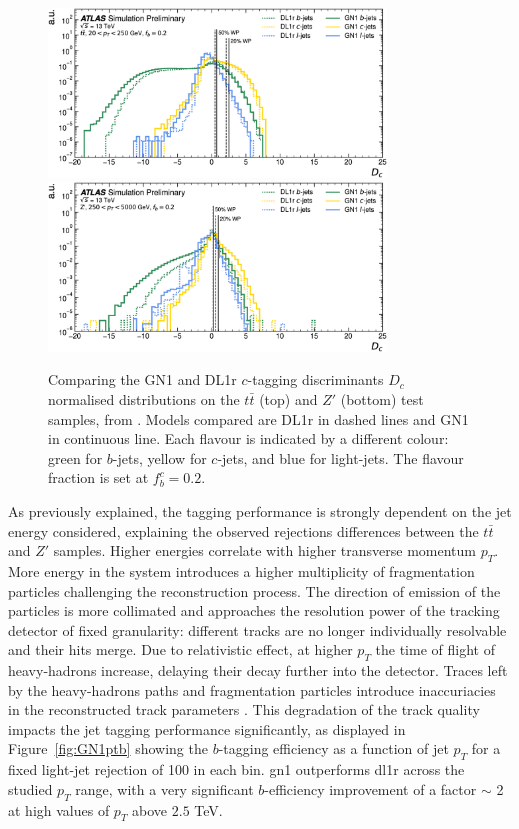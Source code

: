 \begin{figure}[h!]
  \centering
  \includegraphics[width=0.8\textwidth]{Images/FTAG/GN/GN1/eff/ttc.png}
  \includegraphics[width=0.8\textwidth]{Images/FTAG/GN/GN1/eff/zpc.png}
  \caption{Comparing the GN1 and DL1r $c$-tagging discriminants $D_c$ normalised distributions on the $t\bar{t}$ (top) and $Z'$ (bottom) test samples, from \cite{ATL-PHYS-PUB-2022-027}. Models compared are DL1r in dashed lines and GN1 in continuous line. Each flavour is indicated by a different colour: green for $b$-jets, yellow for $c$-jets, and blue for light-jets. The flavour fraction is set at $f^c_b = 0.2$.}
  \label{fig:GN1disc}
\end{figure} 

As previously explained, the tagging performance is strongly dependent on the jet energy considered, explaining the observed rejections differences between the $t\bar{t}$ and $Z'$ samples. Higher energies correlate with higher transverse momentum $p_T$. More energy in the system introduces a higher multiplicity of fragmentation particles challenging the reconstruction process. The direction of emission of the particles is more collimated and approaches the resolution power of the tracking detector of fixed granularity: different tracks are no longer individually resolvable and their hits merge. Due to relativistic effect, at higher $p_T$ the time of flight of heavy-hadrons increase, delaying their decay further into the detector. Traces left by the heavy-hadrons paths and fragmentation particles introduce inaccuriacies in the reconstructed track parameters \cite{ATLAS-tracks-algo}. This degradation of the track quality impacts the jet tagging performance significantly, as displayed in Figure~\ref{fig:GN1ptb} showing the $b$-tagging efficiency as a function of jet $p_T$ for a fixed light-jet rejection of 100 in each bin. \gls{gn1} outperforms \gls{dl1r} across the studied $p_T$ range, with a very significant $b$-efficiency improvement of a factor $\sim$ 2 at high values of $p_T$ above $2.5$ TeV. 

